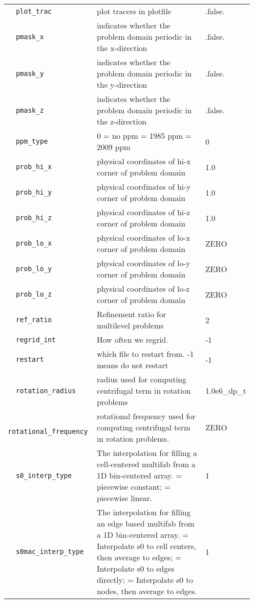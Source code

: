 {\begin{center}
\begin{longtable}{|l|p{3.25in}|l|}
\verb=  plot_trac  = &   plot tracers in plotfile  &  .false. \\
\verb=  pmask_x  = &   indicates whether the problem domain periodic in the x-direction  &  .false. \\
\verb=  pmask_y  = &   indicates whether the problem domain periodic in the y-direction  &  .false. \\
\verb=  pmask_z  = &   indicates whether the problem domain periodic in the z-direction  &  .false. \\
\verb=  ppm_type  = &   0 = no ppm \newline 1 = 1985 ppm \newline 2 = 2009 ppm  &  0 \\
\verb=  prob_hi_x  = &   physical coordinates of hi-x corner of problem domain  &  1.0 \\
\verb=  prob_hi_y  = &   physical coordinates of hi-y corner of problem domain  &  1.0 \\
\verb=  prob_hi_z  = &   physical coordinates of hi-z corner of problem domain  &  1.0 \\
\verb=  prob_lo_x  = &   physical coordinates of lo-x corner of problem domain  &  ZERO \\
\verb=  prob_lo_y  = &   physical coordinates of lo-y corner of problem domain  &  ZERO \\
\verb=  prob_lo_z  = &   physical coordinates of lo-z corner of problem domain  &  ZERO \\
\verb=  ref_ratio  = &   Refinement ratio for multilevel problems  &  2 \\
\verb=  regrid_int  = &   How often we regrid.  &  -1 \\
\verb=  restart  = &   which file to restart from.  -1 means do not restart  &  -1 \\
\verb=  rotation_radius  = &   radius used for computing centrifugal term in rotation problems  &  1.0e6\_dp\_t \\
\verb=  rotational_frequency  = &   rotational frequency used for computing centrifugal term in rotation problems.  &  ZERO \\
\verb=  s0_interp_type  = &   The interpolation for filling a cell-centered multifab from a 1D bin-centered array. \newline 1 = piecewise constant; \newline 2 = piecewise linear.  &  1 \\
\verb=  s0mac_interp_type  = &   The interpolation for filling an edge based multifab from a 1D bin-centered array. \newline 1 = Interpolate s0 to cell centers, then average to edges; \newline 2 = Interpolate s0 to edges directly;                \newline 3 = Interpolate s0 to nodes, then average to edges.  &  1 \\

\end{longtable}
\end{center}}
